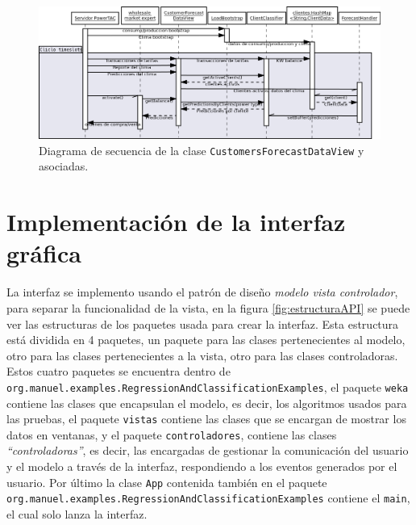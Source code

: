 \begin{figure}[h]
	\centering
	\includegraphics[width=17.5cm]{img/diagramaDeSecuencia.png}
	\caption{Diagrama de secuencia de la clase \texttt{CustomersForecastDataView} y asociadas.}
	\label{fig:diagramaDeSecuencia}
\end{figure}


\section{Implementación de la interfaz gráfica} \label{sec:implementacionInterfazGraf}

La interfaz se implemento usando el patrón de diseño  \textit{modelo vista controlador}, para separar la funcionalidad de la vista, en la figura \ref{fig:estructuraAPI} se puede ver las estructuras de los paquetes usada para crear la interfaz.
Esta estructura está dividida en 4 paquetes, un paquete para las clases pertenecientes al modelo, otro para las clases pertenecientes a la vista, otro para las clases controladoras. Estos cuatro paquetes se encuentra dentro de  \texttt{org.manuel.examples.RegressionAndClassificationExamples}, el paquete \texttt{weka} contiene las clases que encapsulan el modelo, es decir, los algoritmos usados para las pruebas, el paquete \texttt{vistas} contiene las clases que se encargan de mostrar los datos en ventanas, y el paquete \texttt{controladores}, contiene las clases \textit{``controladoras''}, es decir, las encargadas de gestionar la comunicación del usuario y el modelo a través de la interfaz, respondiendo a los eventos generados por el usuario. Por último la clase \texttt{App} contenida también en el paquete \texttt{org.manuel.examples.RegressionAndClassificationExamples} contiene el \texttt{main}, el cual solo lanza la interfaz. 

